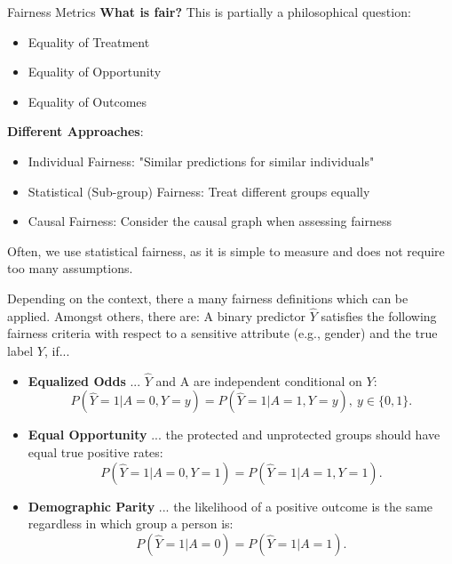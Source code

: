 \begin{vbframe}{Fairness Metrics}
\textbf{What is fair?}
\newline
This is partially a philosophical question:
\begin{itemize}
\item Equality of Treatment
\item Equality of Opportunity
\item Equality of Outcomes 
\end{itemize}

\textbf{Different Approaches}:

\begin{itemize}
\item Individual Fairness: 
"Similar predictions for similar individuals" 


\item Statistical (Sub-group) Fairness:
Treat different groups equally


\item Causal Fairness:
Consider the causal graph when assessing fairness
\end{itemize}

Often, we use statistical fairness, as it is simple to measure and does not require too many assumptions.

\framebreak
\begin{footnotesize}
Depending on the context, there a many fairness definitions which can be applied. Amongst others, there are: 
\vfill
A binary predictor $\hat{Y}$ satisfies the following fairness criteria with respect to a sensitive attribute (e.g., gender) and the true label $Y$, if...

\begin{itemize}

\item \textbf{Equalized Odds} 
... $\hat{Y}$ and A are independent conditional on $Y$:
$$P(\hat{Y}=1|A=0,Y =y) = P(\hat{Y}=1|A=1,Y =y),\ y \in \{0,1\}.$$
\item \textbf{Equal Opportunity}
... the protected and unprotected groups should have equal true positive rates:
$$P(\hat{Y}=1|A=0,Y=1) = P(\hat{Y}=1|A=1,Y=1).$$
\item \textbf{Demographic Parity}
... the likelihood of a positive outcome
is the same regardless in which group a person is: 
$$P(\hat{Y}=1|A=0) = P(\hat{Y}=1|A=1).$$


\end{itemize}
\end{footnotesize}
\end{vbframe}
